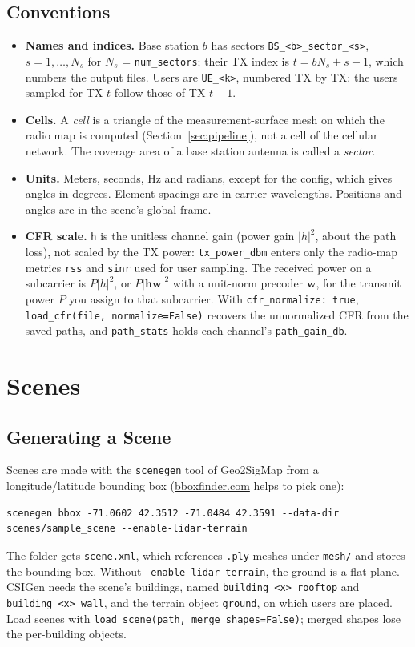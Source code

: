 \documentclass{article}
\newcommand{\key}[1]{\texttt{#1}}
\begin{document}
\subsection{Conventions}
\begin{itemize}
  \item \textbf{Names and indices.} Base station $b$ has sectors \texttt{BS\_<b>\_sector\_<s>}, $s = 1, \dots, N_s$ for $N_s$ = \key{num\_sectors}; their TX index is $t = b N_s + s - 1$, which numbers the output files. Users are \texttt{UE\_<k>}, numbered TX by TX: the users sampled for TX $t$ follow those of TX $t-1$.
  \item \textbf{Cells.} A \emph{cell} is a triangle of the measurement-surface mesh on which the radio map is computed (Section~\ref{sec:pipeline}), not a cell of the cellular network. The coverage area of a base station antenna is called a \emph{sector}.
  \item \textbf{Units.} Meters, seconds, Hz and radians, except for the config, which gives angles in degrees. Element spacings are in carrier wavelengths. Positions and angles are in the scene's global frame.
  \item \textbf{CFR scale.} \texttt{h} is the unitless channel gain (power gain $|h|^2$, about the path loss), not scaled by the TX power: \key{tx\_power\_dbm} enters only the radio-map metrics \texttt{rss} and \texttt{sinr} used for user sampling. The received power on a subcarrier is $P |h|^2$, or $P |\mathbf{h}\mathbf{w}|^2$ with a unit-norm precoder $\mathbf{w}$, for the transmit power $P$ you assign to that subcarrier. With \key{cfr\_normalize: true}, \texttt{load\_cfr(file, normalize=False)} recovers the unnormalized CFR from the saved paths, and \texttt{path\_stats} holds each channel's \texttt{path\_gain\_db}.
\end{itemize}

\clearpage
\section{Scenes}
\subsection{Generating a Scene}
Scenes are made with the \texttt{scenegen} tool of Geo2SigMap from a longitude/latitude bounding box (\href{https://bboxfinder.com}{bboxfinder.com} helps to pick one):
\begin{verbatim}
scenegen bbox -71.0602 42.3512 -71.0484 42.3591 --data-dir scenes/sample_scene --enable-lidar-terrain
\end{verbatim}
The folder gets \texttt{scene.xml}, which references \texttt{.ply} meshes under \texttt{mesh/} and stores the bounding box. Without \texttt{--enable-lidar-terrain}, the ground is a flat plane. CSIGen needs the scene's buildings, named \texttt{building\_<x>\_rooftop} and \texttt{building\_<x>\_wall}, and the terrain object \texttt{ground}, on which users are placed. Load scenes with \texttt{load\_scene(path, merge\_shapes=False)}; merged shapes lose the per-building objects.
\end{document}
